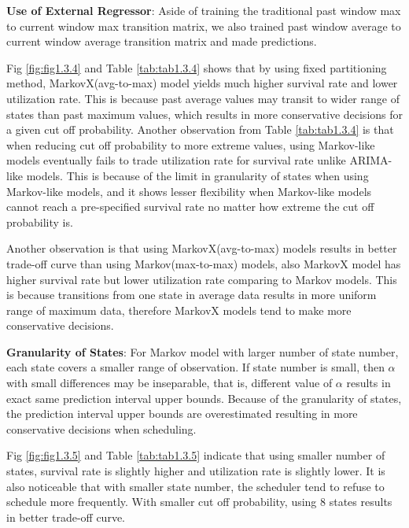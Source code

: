 \documentclass{article}
\begin{document}
\begin{flushleft}
\textbf{Use of External Regressor}: Aside of training the traditional past window max to current window max transition matrix, we also trained past window average to current window average transition matrix and made predictions. 

Fig \ref{fig:fig1.3.4} and Table \ref{tab:tab1.3.4} shows that by using fixed partitioning method, MarkovX(avg-to-max) model yields much higher survival rate and lower utilization rate. This is because past average values may transit to wider range of states than past maximum values, which results in more conservative decisions for a given cut off probability. Another observation from Table \ref{tab:tab1.3.4} is that when reducing cut off probability to more extreme values, using Markov-like models eventually fails to trade utilization rate for survival rate unlike ARIMA-like models. This is because of the limit in granularity of states when using Markov-like models, and it shows lesser flexibility when Markov-like models cannot reach a pre-specified survival rate no matter how extreme the cut off probability is. 

Another observation is that using MarkovX(avg-to-max) models results in better trade-off curve than using Markov(max-to-max) models, also MarkovX model has higher survival rate but lower utilization rate comparing to Markov models. This is because transitions from one state in average data results in more uniform range of maximum data, therefore MarkovX models tend to make more conservative decisions.
\end{flushleft}

\begin{flushleft}
\textbf{Granularity of States}: For Markov model with larger number of state number, each state covers a smaller range of observation. If state number is small, then $\alpha$ with small differences may be inseparable, that is, different value of $\alpha$ results in exact same prediction interval upper bounds. Because of the granularity of states, the prediction interval upper bounds are overestimated resulting in more conservative decisions when scheduling.

Fig \ref{fig:fig1.3.5} and Table \ref{tab:tab1.3.5} indicate that using smaller number of states, survival rate is slightly higher and utilization rate is slightly lower. It is also noticeable that with smaller state number, the scheduler tend to refuse to schedule more frequently. With smaller cut off probability, using $8$ states results in better trade-off curve.
\end{flushleft}
\end{document}
